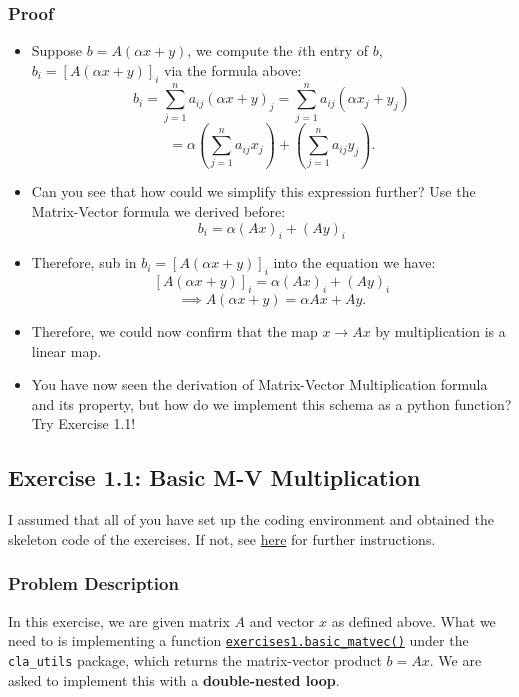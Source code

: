 \subsubsection*{Proof}
\begin{itemize}
    \item Suppose $b = A(\alpha x + y)$, we compute the $i$th entry of $b$,  $b_i = [A(\alpha x + y)]_{i}$ via the formula above:
      \[
        b_i = \sum_{j = 1}^{n} a_{ij}(\alpha x + y)_j =  \sum_{j = 1}^{n} a_{ij}(\alpha x_j + y_j)
      \]
      \[
        = \alpha(\sum_{j = 1}^{n} a_{ij} x_j) + (\sum_{j = 1}^{n} a_{ij} y_{j})
      .\]
    \item Can you see that how could we simplify this expression further? Use the Matrix-Vector formula we derived before:
      \[
        b_i = \alpha (Ax)_i + (Ay)_i
      \]
    \item Therefore, sub in $b_i = [A(\alpha x + y)]_i$ into the equation we have:
      \[
        [A(\alpha x + y)]_i = \alpha (Ax)_i + (Ay)_i
      \]
      \[
        \implies A(\alpha x + y) = \alpha Ax + Ay
      .\]
    \item Therefore, we could now confirm that the map $x \to Ax$ by multiplication is a linear map.
    \item You have now seen the derivation of Matrix-Vector Multiplication formula and its property, but how do we implement this schema as a python function? Try Exercise 1.1!
\end{itemize}

\subsection*{Exercise 1.1: Basic M-V Multiplication}
I assumed that all of you have set up the coding environment and obtained the skeleton code of the exercises. If not, see \href{https://comp-lin-alg.github.io}{here} for further instructions.
\subsubsection*{Problem Description}
In this exercise, we are given matrix $A$ and vector $x$ as defined above. What we need to is implementing a function \href{https://comp-lin-alg.github.io/cla_utils.html#cla_utils.exercises1.basic_matvec}{\texttt{exercises1.basic\_matvec()}}
under the \texttt{cla\_utils} package, which returns the matrix-vector product $b = Ax$. We are asked to implement this with a \textbf{double-nested loop}.

